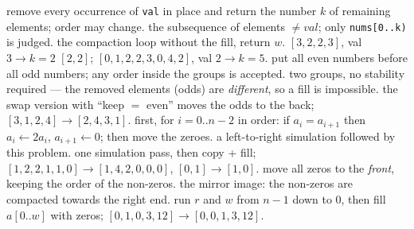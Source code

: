 \begin{variantsbox}
  {remove every occurrence of \texttt{val} in place and return the number $k$ of remaining elements; order may change.}
  {the subsequence of elements $\ne \mathit{val}$; only \texttt{nums[0..k)} is judged.}
  {the compaction loop without the fill, return $w$. $[3,2,2,3]$, val $3 \to k = 2$ $[2,2]$; $[0,1,2,2,3,0,4,2]$, val $2 \to k = 5$.}
  {put all even numbers before all odd numbers; any order inside the groups is accepted.}
  {two groups, no stability required --- the removed elements (odds) are \emph{different}, so a fill is impossible.}
  {the swap version with ``keep $=$ even'' moves the odds to the back; $[3,1,2,4] \to [2,4,3,1]$.}
  {first, for $i = 0..n-2$ in order: if $a_i = a_{i+1}$ then $a_i \gets 2a_i$, $a_{i+1} \gets 0$; then move the zeroes.}
  {a left-to-right simulation followed by this problem.}
  {one simulation pass, then copy + fill; $[1,2,2,1,1,0] \to [1,4,2,0,0,0]$, $[0,1] \to [1,0]$.}
  {move all zeros to the \emph{front}, keeping the order of the non-zeros.}
  {the mirror image: the non-zeros are compacted towards the right end.}
  {run $r$ and $w$ from $n-1$ down to $0$, then fill $a[0..w]$ with zeros; $[0,1,0,3,12] \to [0,0,1,3,12]$.}
\end{variantsbox}
